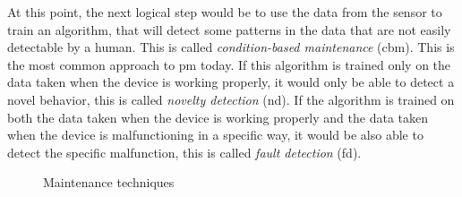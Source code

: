 At this point, the next logical step would be to use the data from the sensor to train an algorithm, that will detect some patterns in the data that are not easily detectable by a human. This is called \emph{condition-based maintenance} (\gls{cbm}). This is the most common approach to \gls{pm} today. If this algorithm is trained only on the data taken when the device is working properly, it would only be able to detect a novel behavior, this is called \emph{novelty detection} (\gls{nd}). If the algorithm is trained on both the data taken when the device is working properly and the data taken when the device is malfunctioning in a specific way, it would be also able to detect the specific malfunction, this is called \emph{fault detection} (\gls{fd}).




\begin{figure}[htbp]
    \centering
    
    \caption{Maintenance techniques}
    \label{fig:maintthechniques}
\end{figure}